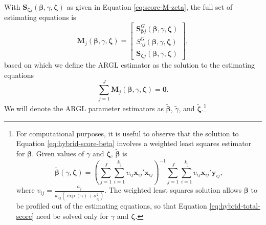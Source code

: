 \documentclass[
  man, donotrepeattitle,floatsintext]{apa7}
\begin{document}
With \(\mathbf{S}_{\boldsymbol\zeta j}\left(\boldsymbol{\beta}, \gamma, \boldsymbol{\zeta}\right)\) as given in Equation \eqref{eq:score-M-zeta}, the full set of estimating equations is
\begin{equation}
\label{eq:hybrid-score}
\mathbf{M}_j(\boldsymbol\beta, \gamma, \boldsymbol\zeta) = \left[\begin{array}{c} \mathbf{S}^G_{\boldsymbol\beta j}(\boldsymbol\beta, \gamma, \boldsymbol\zeta) \\ S^G_{\gamma j}(\boldsymbol\beta, \gamma, \boldsymbol\zeta) \\ \mathbf{S}_{\boldsymbol\zeta j}(\boldsymbol\beta, \gamma, \boldsymbol\zeta) \end{array}\right],
\end{equation}
based on which we define the ARGL estimator as the solution to the estimating equations
\begin{equation}
\label{eq:hybrid-total-score}
\sum_{j=1}^J \mathbf{M}_j(\boldsymbol\beta, \gamma, \boldsymbol\zeta) = \mathbf{0}.
\end{equation}
We will denote the ARGL parameter estimators as \(\boldsymbol{\tilde\beta}\), \(\tilde\gamma\), and \(\boldsymbol{\tilde\zeta}\).\footnote{For computational purposes, it is useful to observe that the solution to Equation \eqref{eq:hybrid-score-beta} involves a weighted least squares estimator for \(\boldsymbol\beta\). Given values of \(\gamma\) and \(\boldsymbol\zeta\), \(\boldsymbol{\tilde\beta}\) is
  \[
  \boldsymbol{\tilde\beta}(\gamma, \boldsymbol\zeta) = \left(\sum_{j=1}^J \sum_{i=1}^{k_j} v_{ij} \mathbf{x}_{ij}' \mathbf{x}_{ij}\right)^{-1} \sum_{j=1}^J \sum_{i=1}^{k_j} v_{ij} \mathbf{x}_{ij}' \mathbf{y}_{ij},
  \]
  where \(v_{ij} = \frac{a_j}{w_{ij} \left(\exp(\gamma) + \sigma_{ij}^2\right)}\).
  The weighted least squares solution allows \(\boldsymbol\beta\) to be profiled out of the estimating equations, so that Equation \eqref{eq:hybrid-total-score} need be solved only for \(\gamma\) and \(\boldsymbol\zeta\).}
\end{document}
